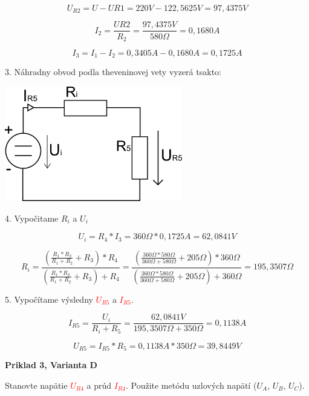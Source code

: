 \documentclass[a4paper,12pt]{article}
\begin{document}
\begin{equation*}
U_{R2} =U - U{R1} = 220V - 122,5625V = 97,4375V
\end{equation*}

\begin{equation*}
I_2 = \frac{U{R2}}{R_2} = \frac{97,4375V}{580\Omega} = 0,1680A
\end{equation*}

\begin{equation*}
I_3 = I_1 - I_2 =  0,3405A - 0,1680A = 0,1725A
\end{equation*}

3. Náhradny obvod podla theveninovej vety vyzerá tsakto: 

\includegraphics[height=5cm]{img/pr2b}

4. Vypočitame $R_i$ a $U_i$

\begin{equation*}
U_i = R_4 * I_3 = 360\Omega * 0,1725A = 62,0841V
\end{equation*}

\begin{equation*}
R_i = \frac{(\frac{R_1 * R_2}{R_1+R_2} + R_3) * R_4} {(\frac{R_1 * R_2}{R_1+R_2} + R_3)+R_4} = \frac{(\frac{360\Omega * 580\Omega}{360\Omega+580\Omega} + 205\Omega) * 360\Omega} {(\frac{360\Omega* 580\Omega}{360\Omega+580\Omega} + 205\Omega)+360\Omega} = 195,3507\Omega
\end{equation*}

5. Vypočítame výsledny \textcolor{red}{$U_{R5}$} a \textcolor{red}{$I_{R5}$}.

\begin{equation*}
I_{R5} = \frac{U_i}{R_i+R_5} = \frac{62,0841V}{195,3507\Omega + 350\Omega} = 0,1138A
\end{equation*}

\begin{equation*}
U_{R5} = I_{R5} * R_5 =  0,1138 A * 350\Omega = 39,8449V
\end{equation*}

\newpage
\begin{center}
\textbf{Priklad 3, Varianta D}
\end{center}
\bigskip
Stanovte napätie 
\textcolor{red}{$U_{R4}$}
a prúd
\textcolor{red}{$I_{R4}$}.
Použite metódu uzlových napätí ($U_A$, $U_B$,  $U_C$). 
\bigskip
\end{document}
